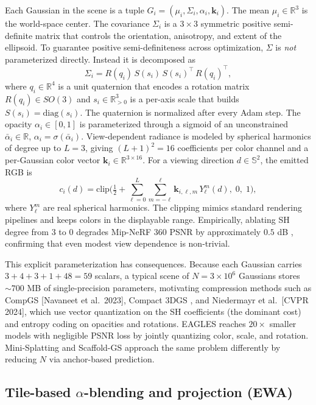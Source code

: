 \documentclass{article}
\begin{document}
Each Gaussian in the scene is a tuple \(G_i=(\mu_i,\Sigma_i,\alpha_i,\mathbf{k}_i)\). The mean \(\mu_i\in\mathbb{R}^3\) is the world-space center. The covariance \(\Sigma_i\) is a \(3\times3\) symmetric positive semi-definite matrix that controls the orientation, anisotropy, and extent of the ellipsoid. To guarantee positive semi-definiteness across optimization, \(\Sigma\) is \emph{not} parameterized directly. Instead it is decomposed as
\[\Sigma_i = R(q_i)\,S(s_i)\,S(s_i)^{\top}\,R(q_i)^{\top},\]
where \(q_i\in\mathbb{R}^4\) is a unit quaternion that encodes a rotation matrix \(R(q_i)\in SO(3)\) and \(s_i\in\mathbb{R}^3_{>0}\) is a per-axis scale that builds \(S(s_i)=\mathrm{diag}(s_i)\). The quaternion is normalized after every Adam step. The opacity \(\alpha_i\in[0,1]\) is parameterized through a sigmoid of an unconstrained \(\bar\alpha_i\in\mathbb{R}\), \(\alpha_i = \sigma(\bar\alpha_i)\). View-dependent radiance is modeled by spherical harmonics of degree up to \(L=3\), giving \((L+1)^2 = 16\) coefficients per color channel and a per-Gaussian color vector \(\mathbf{k}_i\in\mathbb{R}^{3\times 16}\). For a viewing direction \(d\in\mathbb{S}^2\), the emitted RGB is
\[c_i(d) = \mathrm{clip}\Big(\tfrac{1}{2} + \sum_{\ell=0}^{L}\sum_{m=-\ell}^{\ell} \mathbf{k}_{i,\ell,m}\,Y_{\ell}^{m}(d),\;0,\;1\Big),\]
where \(Y_{\ell}^m\) are real spherical harmonics. The clipping mimics standard rendering pipelines and keeps colors in the displayable range. Empirically, ablating SH degree from \(3\) to \(0\) degrades Mip-NeRF 360 PSNR by approximately \(0.5\) dB \cite{kerbl20233dgaussiansplattin}, confirming that even modest view dependence is non-trivial.

This explicit parameterization has consequences. Because each Gaussian carries \(3+4+3+1+48=59\) scalars, a typical scene of \(N=3{\times}10^6\) Gaussians stores \(\sim 700\) MB of single-precision parameters, motivating compression methods such as CompGS {[}Navaneet et al.~2023{]}, Compact 3DGS \cite{lee2024compact3dgaussianr}, and Niedermayr et al.~{[}CVPR 2024{]}, which use vector quantization on the SH coefficients (the dominant cost) and entropy coding on opacities and rotations. EAGLES \cite{girish2024eaglesefficientacc} reaches \(20\times\) smaller models with negligible PSNR loss by jointly quantizing color, scale, and rotation. Mini-Splatting \cite{fang2024minisplattingrepre} and Scaffold-GS \cite{lu2024scaffoldgsstructur} approach the same problem differently by reducing \(N\) via anchor-based prediction.

\subsection{\texorpdfstring{Tile-based \(\alpha\)-blending and projection (EWA)}{Tile-based \textbackslash alpha-blending and projection (EWA)}}\label{tile-based-alpha-blending-and-projection-ewa}
\end{document}
